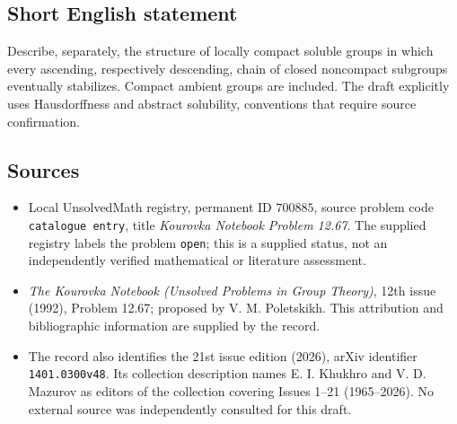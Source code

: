 \documentclass[11pt]{article}
\begin{document}
\subsection{Short English statement}
Describe, separately, the structure of locally compact soluble groups in which every ascending, respectively descending, chain of closed noncompact subgroups eventually stabilizes. Compact ambient groups are included. The draft explicitly uses Hausdorffness and abstract solubility, conventions that require source confirmation.
\subsection{Sources}
\begin{itemize}
\item Local UnsolvedMath registry, permanent ID \(700885\), source problem code \texttt{catalogue entry}, title \emph{Kourovka Notebook Problem 12.67}. The supplied registry labels the problem \texttt{open}; this is a supplied status, not an independently verified mathematical or literature assessment.
\item \emph{The Kourovka Notebook (Unsolved Problems in Group Theory)}, 12th issue (1992), Problem 12.67; proposed by V. M. Poletskikh. This attribution and bibliographic information are supplied by the record.
\item The record also identifies the 21st issue edition (2026), arXiv identifier \texttt{1401.0300v48}. Its collection description names E. I. Khukhro and V. D. Mazurov as editors of the collection covering Issues 1--21 (1965--2026). No external source was independently consulted for this draft.
\end{itemize}
\end{document}
